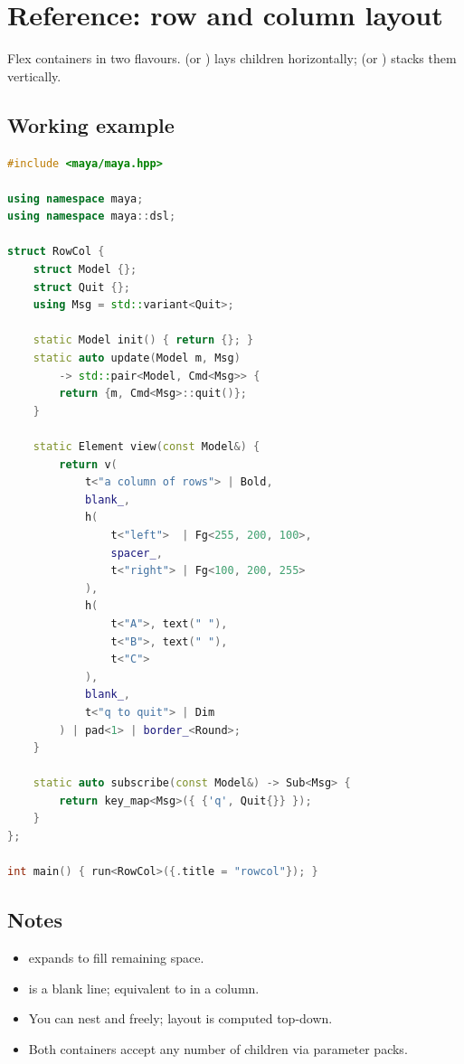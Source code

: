 \chapter{Reference: row and column layout}
\label{ch:refman-rowcol}

\begin{aside}
Flex containers in two flavours.  (or
) lays children horizontally;  (or
) stacks them vertically.
\end{aside}

\section{Working example}

\begin{lstlisting}[language=C++]
#include <maya/maya.hpp>

using namespace maya;
using namespace maya::dsl;

struct RowCol {
    struct Model {};
    struct Quit {};
    using Msg = std::variant<Quit>;

    static Model init() { return {}; }
    static auto update(Model m, Msg)
        -> std::pair<Model, Cmd<Msg>> {
        return {m, Cmd<Msg>::quit()};
    }

    static Element view(const Model&) {
        return v(
            t<"a column of rows"> | Bold,
            blank_,
            h(
                t<"left">  | Fg<255, 200, 100>,
                spacer_,
                t<"right"> | Fg<100, 200, 255>
            ),
            h(
                t<"A">, text(" "),
                t<"B">, text(" "),
                t<"C">
            ),
            blank_,
            t<"q to quit"> | Dim
        ) | pad<1> | border_<Round>;
    }

    static auto subscribe(const Model&) -> Sub<Msg> {
        return key_map<Msg>({ {'q', Quit{}} });
    }
};

int main() { run<RowCol>({.title = "rowcol"}); }
\end{lstlisting}

\section{Notes}

\begin{itemize}[leftmargin=*]
  \item {} expands to fill remaining space.
  \item {} is a blank line; equivalent to
     in a column.
  \item You can nest  and 
    freely; layout is computed top-down.
  \item Both containers accept any number of children via
    parameter packs.
\end{itemize}

